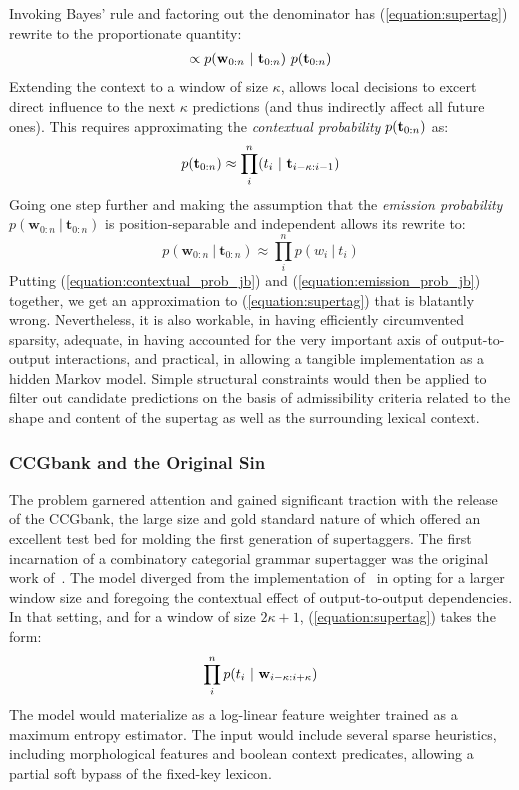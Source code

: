 Invoking Bayes' rule and factoring out the denominator has (\ref{equation:supertag}) rewrite to the proportionate quantity:
\begin{align}
\propto p(\mathbf{w}_{0:n} \ | \ \mathbf{t}_{0:n})~ p(\mathbf{t}_{0:n})
\end{align}
Extending the context to a window of size $\kappa$, allows local decisions to excert direct influence to the next $\kappa$ predictions (and thus indirectly affect all future ones).
This requires approximating the \textit{contextual probability} $p(\mathbf{t}_{0:n})$ as:
\begin{equation}\label{equation:contextual_prob_jb}
p(\mathbf{t}_{0:n}) \approx \prod_i^n (t_i \ | \ \mathbf{t}_{i-\kappa:i-1})
\end{equation}
Going one step further and making the assumption that the \textit{emission probability} $p(\mathbf{w}_{0:n} \ | \ \mathbf{t}_{0:n})$ is position-separable and independent allows its rewrite to:
\begin{equation}\label{equation:emission_prob_jb}
p(\mathbf{w}_{0:n} \ | \ \mathbf{t}_{0:n}) \approx \prod_i^n p(w_i \ | \ t_i)
\end{equation}
Putting (\ref{equation:contextual_prob_jb}) and (\ref{equation:emission_prob_jb}) together, we get an approximation to (\ref{equation:supertag}) that is blatantly wrong.
Nevertheless, it is also workable, in having efficiently circumvented sparsity, adequate, in having accounted for the very important axis of output-to-output interactions, and practical, in allowing a tangible implementation as a hidden Markov model.
Simple structural constraints would then be applied to filter out candidate predictions on the basis of admissibility criteria related to the shape and content of the supertag as well as the surrounding lexical context.


\subsubsection{CCGbank and the Original Sin}
The problem garnered attention and gained significant traction with the release of the CCGbank, the large size and gold standard nature of which offered an excellent test bed for molding the first generation of supertaggers.
The first incarnation of a combinatory categorial grammar supertagger was the original work of~\citet{clark2002supertagging}.
The model diverged from the implementation of~\citet{bangalore1999supertagging} in opting for a larger window size and foregoing the contextual effect of output-to-output dependencies.
In that setting, and for a window of size $2\kappa + 1$, (\ref{equation:supertag}) takes the form:
\begin{equation}
	\prod_i^n p(t_i \ | \ \mathbf{w}_{i - \kappa : i+\kappa})
\end{equation}
The model would materialize as a log-linear feature weighter trained as a maximum entropy estimator.
The input would include several sparse heuristics, including morphological features and boolean context predicates, allowing a partial soft bypass of the fixed-key lexicon.

